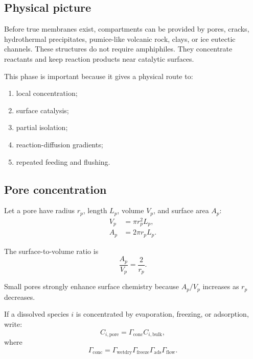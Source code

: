 \documentclass[11pt]{article}
\begin{document}
\subsection{Physical picture}

Before true membranes exist, compartments can be provided by pores, cracks,
hydrothermal precipitates, pumice-like volcanic rock, clays, or ice eutectic
channels. These structures do not require amphiphiles. They concentrate
reactants and keep reaction products near catalytic surfaces.

This phase is important because it gives a physical route to:
\begin{enumerate}
    \item local concentration;
    \item surface catalysis;
    \item partial isolation;
    \item reaction-diffusion gradients;
    \item repeated feeding and flushing.
\end{enumerate}

\subsection{Pore concentration}

Let a pore have radius $r_p$, length $L_p$, volume $V_p$, and surface area
$A_p$:
\begin{align}
    V_p &= \pi r_p^2 L_p, \\
    A_p &= 2\pi r_p L_p.
\end{align}

The surface-to-volume ratio is
\begin{equation}
    \frac{A_p}{V_p} = \frac{2}{r_p}.
\end{equation}

Small pores strongly enhance surface chemistry because $A_p/V_p$ increases as
$r_p$ decreases.

If a dissolved species $i$ is concentrated by evaporation, freezing, or
adsorption, write:
\begin{equation}
    C_{i,\mathrm{pore}} =
    \Gamma_{\mathrm{conc}} C_{i,\mathrm{bulk}},
\end{equation}
where
\begin{equation}
    \Gamma_{\mathrm{conc}}
    =
    \Gamma_{\mathrm{wetdry}}
    \Gamma_{\mathrm{freeze}}
    \Gamma_{\mathrm{ads}}
    \Gamma_{\mathrm{flow}}.
\end{equation}
\end{document}
